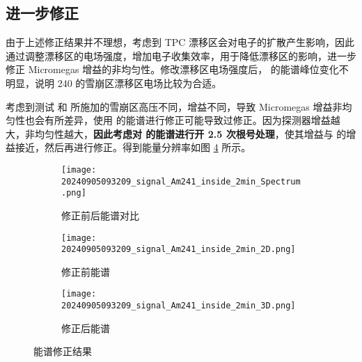 \subsection{进一步修正}
由于上述修正结果并不理想，考虑到 TPC 漂移区会对电子的扩散产生影响，因此通过调整漂移区的电场强度，增加电子收集效率，用于降低漂移区的影响，进一步修正 Micromegas 增益的非均匀性。修改漂移区电场强度后， 的能谱峰位变化不明显，说明 240 的雪崩区漂移区电场比较为合适。

考虑到测试  和  所施加的雪崩区高压不同，增益不同，导致 Micromegas 增益非均匀性也会有所差异，使用  的能谱进行修正可能导致过修正。因为探测器增益越大，非均匀性越大，\textbf{因此考虑对  的能谱进行开 2.5 次根号处理}，使其增益与  的增益接近，然后再进行修正。得到能量分辨率如图 \ref{fig:Am241Spectrum} 所示。

\begin{figure}[htbp]
    \centering
    \begin{subfigure}[t]{0.3\textwidth}
        \texttt{[image: 20240905093209\_signal\_Am241\_inside\_2min\_Spectrum.png]}
        \caption{ 修正前后能谱对比}
        \label{fig:Am241Comp}
    \end{subfigure}
    \hfill
    \begin{subfigure}[t]{0.3\textwidth}
        \texttt{[image: 20240905093209\_signal\_Am241\_inside\_2min\_2D.png]}
        \caption{ 修正前能谱}
        \label{fig:Am241FixBefore}
    \end{subfigure}
    \hfill
    \begin{subfigure}[t]{0.3\textwidth}
        \texttt{[image: 20240905093209\_signal\_Am241\_inside\_2min\_3D.png]}
        \caption{ 修正后能谱}
        \label{fig:Am241FixAfter}
    \end{subfigure}
    \caption{ 能谱修正结果}
    \label{fig:Am241Spectrum}
\end{figure}
